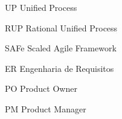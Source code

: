 \begin{siglas}
  \item[UP] Unified Process
  \item[RUP] Rational Unified Process
  \item[SAFe] Scaled Agile Framework
  \item[ER] Engenharia de Requisitos
  \item[PO] Product Owner
  \item[PM] Product Manager
\end{siglas}
